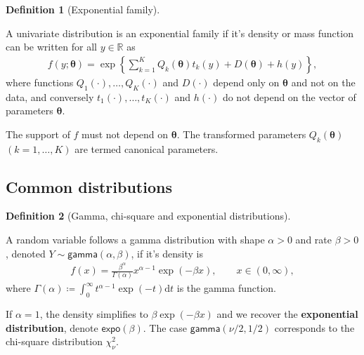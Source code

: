 \documentclass[
  11pt,
  letterpaper,
]{scrbook}
\theoremstyle{definition}
\theoremstyle{plain}
\theoremstyle{plain}
\theoremstyle{definition}
\theoremstyle{definition}
\newtheorem{definition}{Definition}[chapter]
\theoremstyle{remark}
\begin{document}
\begin{definition}[Exponential
family]\protect\hypertarget{def-exponential-family}{}\label{def-exponential-family}

A univariate distribution is an exponential family if it's density or
mass function can be written for all \(y \in \mathbb{R}\) as
\begin{align*}
f(y; \boldsymbol{\theta}) = \exp\left\{ \sum_{k=1}^K Q_k(\boldsymbol{\theta}) t_k(y) + D(\boldsymbol{\theta}) + h(y)\right\}, 
\end{align*} where functions \(Q_1(\cdot), \ldots, Q_K(\cdot)\) and
\(D(\cdot)\) depend only on \(\boldsymbol{\theta}\) and not on the data,
and conversely \(t_1(\cdot), \ldots, t_K(\cdot)\) and \(h(\cdot)\) do
not depend on the vector of parameters \(\boldsymbol{\theta}\).

The support of \(f\) must not depend on \(\boldsymbol{\theta}\). The
transformed parameters \(Q_k(\boldsymbol{\theta})\) \((k=1, \ldots, K)\)
are termed canonical parameters.

\end{definition}

\subsection{Common distributions}\label{common-distributions}

\begin{definition}[Gamma, chi-square and exponential
distributions]\protect\hypertarget{def-gamma}{}\label{def-gamma}

A random variable follows a gamma distribution with shape \(\alpha>0\)
and rate \(\beta>0\), denoted \(Y \sim \mathsf{gamma}(\alpha, \beta)\),
if it's density is \begin{align*}
f(x) = \frac{\beta^\alpha}{\Gamma(\alpha)}x^{\alpha-1}\exp(-\beta x), \qquad x \in (0, \infty),
\end{align*} where
\(\Gamma(\alpha)\coloneqq\int_0^\infty t^{\alpha-1}\exp(-t)\mathrm{d} t\)
is the gamma function.

If \(\alpha=1\), the density simplifies to \(\beta \exp(-\beta x)\) and
we recover the \textbf{exponential distribution}, denote
\(\mathsf{expo}(\beta)\). The case \(\mathsf{gamma}(\nu/2, 1/2)\)
corresponds to the chi-square distribution \(\chi^2_\nu\).

\end{definition}
\end{document}
